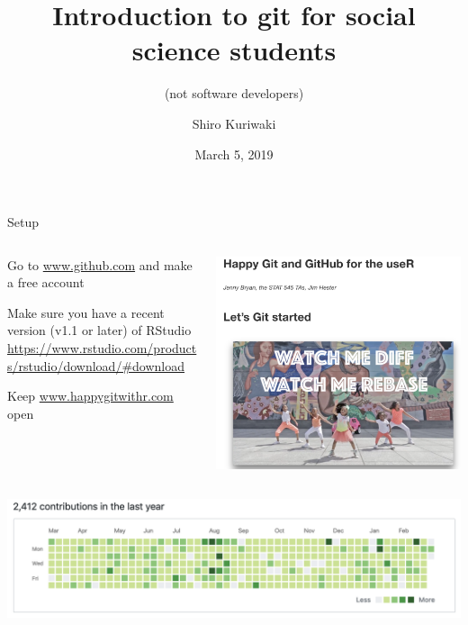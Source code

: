 \documentclass[ignorenonframetext,notes, 10pt, aspectratio=169]{beamer}
\title{\textbf{\Large{Introduction to git for social science students}}}
\subtitle{(not software developers)}
\author{Shiro Kuriwaki}
\date{March 5, 2019}
\begin{document}
\begin{frame}{Setup}
\begin{columns}[T]
\begin{column}{0.6\textwidth}
\begin{wideenumerate}
\item Go to \url{www.github.com} and make a free account
\item Make sure you have a recent version (v1.1 or later) of RStudio \url{https://www.rstudio.com/products/rstudio/download/\#download}
\item Keep \url{www.happygitwithr.com} open
\end{wideenumerate}
\end{column}
\begin{column}{0.4\textwidth}
\includegraphics[width = \linewidth]{happygit.png}
\end{column}
\end{columns}
\end{frame}

\begin{frame}
\centering
\includegraphics[width = 0.9\linewidth]{portfolio.png}
\maketitle
\end{frame}
\end{document}
